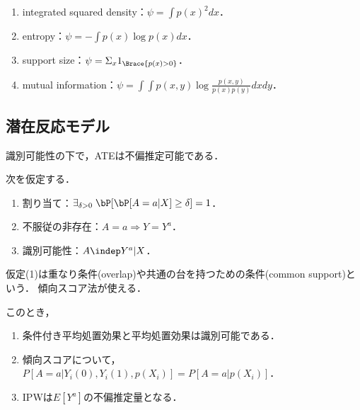 \documentclass[uplatex,dvipdfmx]{jsreport}
\begin{document}
\begin{example}[因果推論以外の文脈で生じる汎関数推定]\mbox{}
    \begin{enumerate}
        \item integrated squared density：$\psi=\int p(x)^2dx$．
        \item entropy：$\psi=-\int p(x)\log p(x)dx$．
        \item support size：$\psi=\Sigma_x1_{\Brace{p(x)>0}}$．
        \item mutual information：$\psi=\int\int p(x,y)\log\frac{p(x,y)}{p(x)p(y)}dxdy$．
    \end{enumerate}
\end{example}

\subsection{潜在反応モデル}

\begin{theorem}[ATE]
    識別可能性の下で，ATEは不偏推定可能である．
\end{theorem}

\begin{axiom}[CATE]
    次を仮定する．
    \begin{enumerate}
        \item 割り当て：$\exists_{\delta>0}\;\bP[\bP[A=a|X]\ge\delta]=1$．
        \item 不服従の非存在：$A=a\Rightarrow Y=Y^a$．
        \item 識別可能性：$A\indep Y^a|X$．
    \end{enumerate}
\end{axiom}
\begin{remarks}
    仮定(1)は重なり条件(overlap)や共通の台を持つための条件(common support)という．
    傾向スコア法が使える．
\end{remarks}
\begin{theorem}
    このとき，
    \begin{enumerate}
        \item 条件付き平均処置効果と平均処置効果は識別可能である．
        \item 傾向スコアについて，$P[A=a|Y_i(0),Y_i(1),p(X_i)]=P[A=a|p(X_i)]$．
        \item IPWは$E[Y^a]$の不偏推定量となる．
    \end{enumerate}
\end{theorem}
\end{document}
